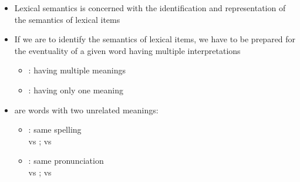 \documentclass[a4paper,landscape,headrule,footrule,xetex]{foils}
\begin{document}

\MyLogo{}

\begin{itemize}
\item Lexical semantics is concerned with the identification and
  representation of the semantics of lexical items
\item If we are to identify the semantics of lexical items, we have to
  be prepared for the eventuality of a given word having 
  multiple interpretations
  \begin{itemize}
  \item {}: having multiple meanings
  \item {}: having only one meaning
  \end{itemize}
\item {} are words with two unrelated meanings:
  \begin{itemize}
  \item {}: same spelling 
    \\  vs ;  vs 
  \item {}: same pronunciation
     \\  vs ;  vs 
  \end{itemize}

\end{itemize}












\end{document}
